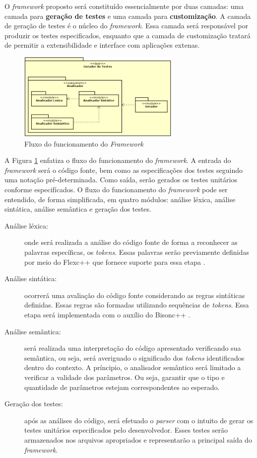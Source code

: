  \par
 \indent O \textit{framework} proposto será constituído essencialmente por duas camadas: uma camada para \textbf{geração de testes} e uma camada para \textbf{customização}. A camada de geração de testes é o núcleo do \textit{framework}. Essa camada será responsável por produzir os testes especificados, enquanto que a camada de customização tratará de permitir a extensibilidade e interface com aplicações extenas.
 
   \begin{figure}[h]
    \centering
    \includegraphics[width=0.7\textwidth]{figuras/module-view-generator.png}
    \caption{Fluxo do funcionamento do \textit{Framework}}
    \label{fig:entradasesaidas}
 \end{figure}
 
 \par
\indent A Figura \ref{fig:entradasesaidas} enfatiza o fluxo do funcionamento do \textit{framework}. A entrada do \textit{framework} será o código fonte, bem como as especificações dos testes seguindo uma notação pré-determinada. Como saída, serão gerados os testes unitários conforme especifícados. O fluxo do funcionamento do \textit{framework} pode ser entendido, de forma simplificada, em quatro módulos: análise léxica, análise sintática, análise semântica e geração dos testes. 
 \begin{description}
 \item[Análise léxica:] onde será realizada a análise do código fonte de forma a reconhecer as palavras específicas, os \textit{tokens}. Essas palavras serão previamente definidas por meio do Flexc++ que fornece suporte para essa etapa \cite{flexcpp2015}.
 \item[Análise sintática:] ocorrerá uma avaliação do código fonte considerando as regras sintáticas definidas. Essas regras são formadas utilizando sequências de \textit{tokens}. Essa etapa será implementada com o auxílio do Bisonc++ \cite{bisoncpp2015}.
 \item[Análise semântica:] será realizada uma interpretação do código apresentado verificando sua semântica, ou seja, será averiguado o significado dos \textit{tokens} identificados dentro do contexto. A príncipio, o analisador semântico será limitado a verificar a validade dos parâmetros. Ou seja, garantir que o tipo e quantidade de parâmetros estejam correspondentes ao esperado.
  \item[Geração dos testes:] após as análises do código, será efetuado o \textit{parser} com o intuito de gerar os testes unitários especificados pelo desenvolvedor. Esses testes serão armazenados nos arquivos apropriados e representarão a principal saída do \textit{framework}.
 \end{description}
 
